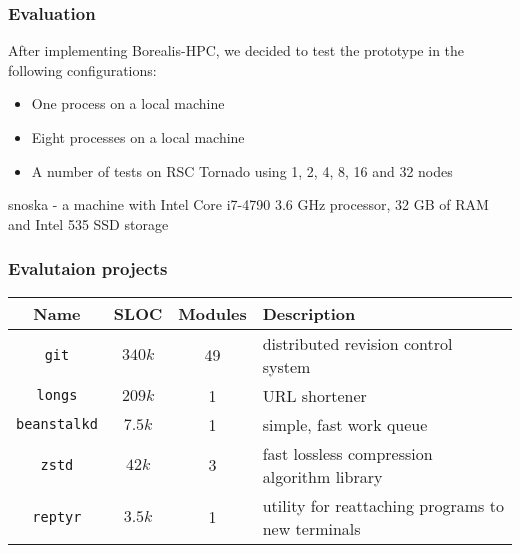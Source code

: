 
\begin{frame}
\frametitle{Evaluation}
After implementing Borealis-HPC, we decided to test the prototype in the following configurations:
	\begin{itemize}
		\item One process on a local machine
		\item Eight processes on a local machine
		\item A number of tests on RSC Tornado using 1, 2, 4, 8, 16 and 32 nodes
	\end{itemize}
	
	snoska - a machine with Intel Core i7-4790 3.6 GHz processor, 32 GB of RAM and Intel 535 SSD storage
\end{frame}


\begin{frame}
\frametitle{Evalutaion projects}
\begin{table}[tbh]
\centering
\label{table:projects}
\begin{adjustbox}{max width=\textwidth}
\begin{tabular}{|c|c|c|l|}
\hline
Name & SLOC & Modules & Description \\ \hline
\texttt{git} & $340k$ & 49 & distributed revision control system \\ \hline
\texttt{longs} & $209k$ & 1  & URL shortener \\ \hline
\texttt{beanstalkd} & $7.5k$ & 1  & simple, fast work queue \\ \hline
\texttt{zstd} & $42k$  & 3  & fast lossless compression algorithm library \\ \hline
\texttt{reptyr} & $3.5k$ & 1  & utility for reattaching programs to new terminals \\ \hline
\end{tabular}
\end{adjustbox}
\end{table}
\end{frame}


